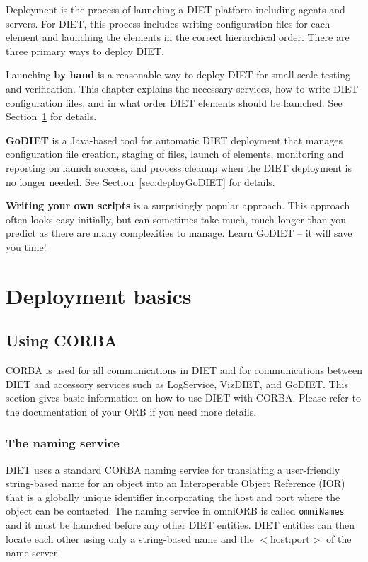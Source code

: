 Deployment is the process of launching a DIET platform including agents
and servers.  For DIET, this process includes writing configuration
files for each element and launching the elements in the correct
hierarchical order. There are three primary ways to deploy DIET.

Launching \textbf{by hand} is a reasonable way to deploy DIET for
small-scale testing and verification. This chapter explains the 
necessary services, how to write DIET configuration files, and in
what order DIET elements should be launched.  See
Section~\ref{sec:deployBasics} for details.

\textbf{GoDIET} is a Java-based tool for automatic DIET deployment
that manages configuration file creation, staging of files, launch
of elements, monitoring and reporting on launch success, and process
cleanup when the DIET deployment is no longer needed.   See 
Section~\ref{sec:deployGoDIET} for details.

\textbf{Writing your own scripts} is a surprisingly popular
approach.  This approach often looks easy initially, but can
sometimes take much, much longer than you predict as there are many
complexities to manage.  Learn GoDIET -- it will save you time!



\section{Deployment basics}
\label{sec:deployBasics}

\subsection{Using CORBA} 
\label{sec:CORBA_services}

CORBA is used for all communications in DIET and for communications
between DIET and accessory services such as LogService, VizDIET, and
GoDIET.  This section gives basic information on how to use DIET
with CORBA.  Please refer to the documentation of your ORB if you
need more details.

\subsubsection{The naming service}

DIET uses a standard CORBA naming service for translating a
user-friendly string-based name for an object into an Interoperable
Object Reference (IOR) that is a globally unique identifier
incorporating the host and port where the object can be contacted.
The naming service in omniORB is called \texttt{omniNames} and it
must be launched before any other DIET entities.  DIET entities can
then locate each other using only a string-based name and the
$<$host:port$>$ of the name server.

